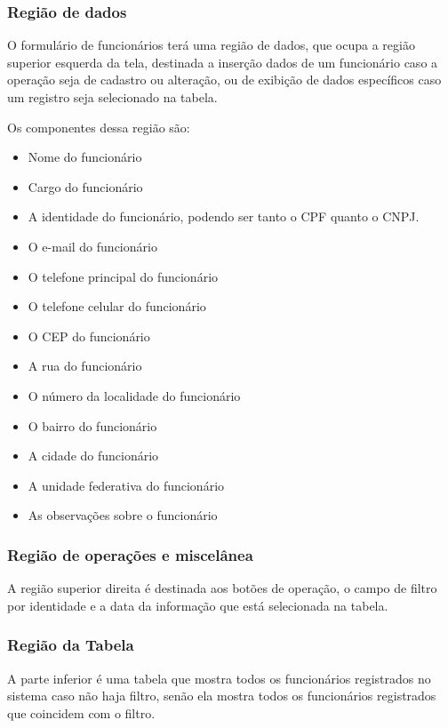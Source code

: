 \documentclass[
	article,			%
	12pt,				%
	oneside,			%
	a4paper,			%
	english,			%
	brazil,				%
	sumario=tradicional
	]{abntex2}
\begin{document}
			\subsubsection{Região de dados}
			O formulário de funcionários terá uma região de dados, que ocupa a região superior esquerda da tela, destinada a inserção dados de um funcionário caso a operação seja de cadastro ou alteração, ou de exibição de dados específicos caso um registro seja selecionado na tabela.
			
			Os componentes dessa região são:
			\begin{itemize}\itemsep1.5pt
				\item Nome do funcionário
				\item Cargo do funcionário
				\item A identidade do funcionário, podendo ser tanto o CPF quanto o CNPJ.
				\item O e-mail do funcionário
				\item O telefone principal do funcionário
				\item O telefone celular do funcionário
				\item O CEP do funcionário
				\item A rua do funcionário
				\item O número da localidade do funcionário
				\item O bairro do funcionário
				\item A cidade do funcionário
				\item A unidade federativa do funcionário
				\item As observações sobre o funcionário
			\end{itemize}	
			\subsubsection{Região de operações e miscelânea}
			A região superior direita é destinada aos botões de operação, o campo de filtro por identidade e a data da informação que está selecionada na tabela.
			\subsubsection{Região da Tabela}
			A parte inferior é uma tabela que mostra todos os funcionários registrados no sistema caso não haja filtro, senão ela mostra todos os funcionários registrados que coincidem com o filtro.
	\newpage
\end{document}

